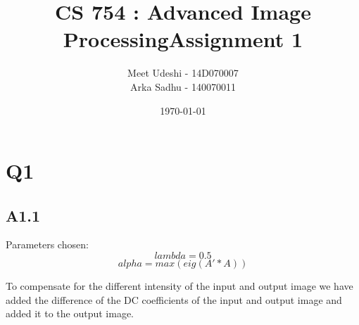 \documentclass{article}
\title{CS 754 : Advanced Image ProcessingAssignment 1}
\author{Meet Udeshi - 14D070007\\
  Arka Sadhu - 140070011\\
}
\date{\today}
\begin{document}
\maketitle

\section*{Q1}
\subsection*{A1.1}

Parameters chosen:
$$lambda = 0.5$$
$$alpha = max(eig(A'*A))$$

To compensate for the different intensity of the input and output image we have added the difference of the DC coefficients of the input
and output image and added it to the output image.
\end{document}
